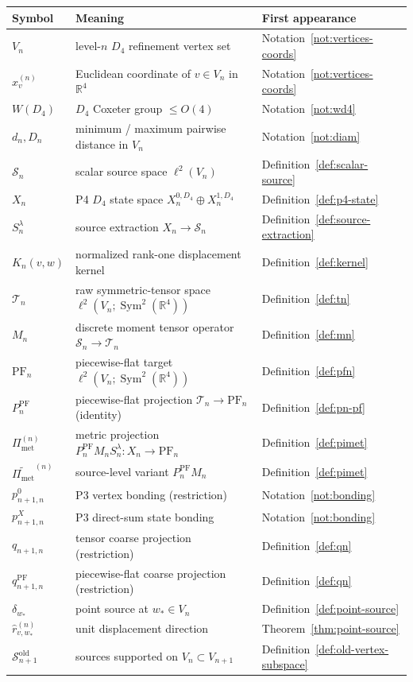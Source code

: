 \documentclass[11pt, a4paper]{amsart}
\theoremstyle{definition}
\newcommand{\R}{\mathbb{R}}
\newcommand{\Sym}{\operatorname{Sym}}
\newcommand{\Met}{\mathrm{met}}
\newcommand{\PF}{\mathrm{PF}}
\newcommand{\Pimet}{\Pi_{\Met}}
\begin{document}
\begin{center}
\begin{tabular}{|l|l|l|}
\hline
Symbol & Meaning & First appearance \\
\hline
$V_n$ & level-$n$ $D_4$ refinement vertex set &
  Notation~\ref{not:vertices-coords} \\
$x_v^{(n)}$ & Euclidean coordinate of $v \in V_n$ in $\R^4$ &
  Notation~\ref{not:vertices-coords} \\
$W(D_4)$ & $D_4$ Coxeter group $\leq O(4)$ &
  Notation~\ref{not:wd4} \\
$d_n, D_n$ & minimum / maximum pairwise distance in $V_n$ &
  Notation~\ref{not:diam} \\
$\mathcal S_n$ & scalar source space $\ell^2(V_n)$ &
  Definition~\ref{def:scalar-source} \\
$X_n$ & P4 $D_4$ state space $X_n^{0, D_4} \oplus X_n^{1, D_4}$ &
  Definition~\ref{def:p4-state} \\
$S_n^\lambda$ & source extraction $X_n \to \mathcal S_n$ &
  Definition~\ref{def:source-extraction} \\
$K_n(v, w)$ & normalized rank-one displacement kernel &
  Definition~\ref{def:kernel} \\
$\mathcal T_n$ & raw symmetric-tensor space
  $\ell^2(V_n; \Sym^2(\R^4))$ & Definition~\ref{def:tn} \\
$M_n$ & discrete moment tensor operator
  $\mathcal S_n \to \mathcal T_n$ & Definition~\ref{def:mn} \\
$\PF_n$ & piecewise-flat target
  $\ell^2(V_n; \Sym^2(\R^4))$ & Definition~\ref{def:pfn} \\
$P_n^\PF$ & piecewise-flat projection
  $\mathcal T_n \to \PF_n$ (identity) &
  Definition~\ref{def:pn-pf} \\
$\Pimet^{(n)}$ & metric projection
  $P_n^\PF M_n S_n^\lambda \colon X_n \to \PF_n$ &
  Definition~\ref{def:pimet} \\
$\widetilde{\Pimet}^{(n)}$ & source-level variant
  $P_n^\PF M_n$ & Definition~\ref{def:pimet} \\
$p_{n+1, n}^0$ & P3 vertex bonding (restriction) &
  Notation~\ref{not:bonding} \\
$p_{n+1, n}^X$ & P3 direct-sum state bonding &
  Notation~\ref{not:bonding} \\
$q_{n+1, n}$ & tensor coarse projection (restriction) &
  Definition~\ref{def:qn} \\
$q_{n+1, n}^\PF$ & piecewise-flat coarse projection (restriction)
  & Definition~\ref{def:qn} \\
$\delta_{w_\ast}$ & point source at $w_\ast \in V_n$ &
  Definition~\ref{def:point-source} \\
$\hat r_{v, w_\ast}^{(n)}$ & unit displacement direction &
  Theorem~\ref{thm:point-source} \\
$\mathcal S_{n+1}^{\mathrm{old}}$ & sources supported on
  $V_n \subset V_{n+1}$ &
  Definition~\ref{def:old-vertex-subspace} \\
\hline
\end{tabular}
\end{center}
\end{document}
